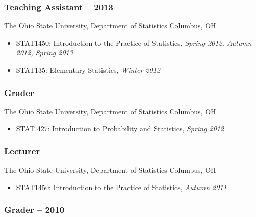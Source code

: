 \documentclass[
  fleqn, oneside]{article}
\providecommand{\tightlist}{%
  \setlength{\itemsep}{0pt}\setlength{\parskip}{0pt}}
\begin{document}
\hypertarget{teaching-assistant-2012-2013}{%
\subsubsection{\texorpdfstring{Teaching Assistant \hfill{}
--
2013}{Teaching Assistant 2012 -- 2013}}\label{teaching-assistant-2012-2013}}

The Ohio State University, Department of Statistics \newline Columbus,
OH

\begin{itemize}
\tightlist
\item
  STAT1450: Introduction to the Practice of Statistics, \emph{Spring
  2012, Autumn 2012, Spring 2013}
\item
  STAT135: Elementary Statistics, \emph{Winter 2012}
\end{itemize}

\hypertarget{grader-2012}{%
\subsubsection{\texorpdfstring{Grader
\hfill{}}{Grader 2012}}\label{grader-2012}}

The Ohio State University, Department of Statistics \newline Columbus,
OH

\begin{itemize}
\tightlist
\item
  STAT 427: Introduction to Probability and Statistics, \emph{Spring
  2012}
\end{itemize}

\hypertarget{lecturer-2011}{%
\subsubsection{\texorpdfstring{Lecturer
\hfill{}}{Lecturer 2011}}\label{lecturer-2011}}

The Ohio State University, Department of Statistics \newline Columbus,
OH

\begin{itemize}
\tightlist
\item
  STAT1450: Introduction to the Practice of Statistics, \emph{Autumn
  2011}
\end{itemize}

\hypertarget{grader-2008-2010}{%
\subsubsection{\texorpdfstring{Grader \hfill{} --
2010}{Grader 2008 -- 2010}}\label{grader-2008-2010}}
\end{document}
